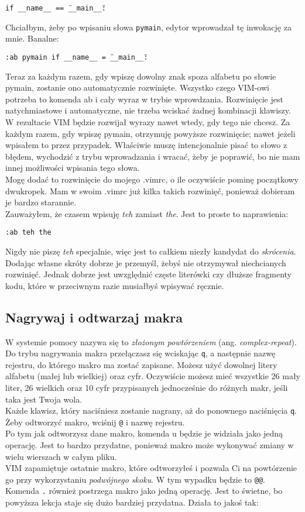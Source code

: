 \documentclass[a4paper,12pt]{article}
\begin{document}
{\tt if \_\_name\_\_ == \"{}\_\_main\_\_\"{}:}

\noindent
Chciałbym, żeby po wpisaniu słowa {\tt pymain}, edytor wprowadzał tę inwokację za mnie. Banalne:

{\tt :ab pymain if \_\_name\_\_ = \"{}\_\_main\_\_\"{}:}

\noindent
Teraz za każdym razem, gdy wpiszę dowolny znak spoza alfabetu po słowie pymain, zostanie ono automatycznie rozwinięte. Wszystko czego VIM-owi potrzeba to komenda ab i cały wyraz w trybie wprowdzania. Rozwinięcie jest natychmiastowe i automatyczne, nie trzeba wciskać żadnej kombinacji klawiszy. W rezultacie VIM będzie rozwijał wyrazy nawet wtedy, gdy tego nie chcesz. Za każdym razem, gdy wpiszę pymain, otrzymuję powyższe rozwinięcie; nawet jeżeli wpisałem to przez przypadek. Właściwie muszę intencjonalnie pisać to słowo z błędem, wychodzić z trybu wprowadzania i wracać, żeby je poprawić, bo nie mam innej możliwości wpisania tego słowa.\\
Mogę dodać to rozwinięcie do mojego .vimrc, o ile oczywiście pominę początkowy dwukropek. Mam w swoim .vimrc już kilka takich rozwinięć, ponieważ dobieram je bardzo starannie.\\
Zauważyłem, że czasem wpisuję {\it teh} zamiast {\it the}. Jest to proste to naprawienia:

{\tt :ab teh the}

\noindent
Nigdy nie piszę {\it teh} specjalnie, więc jest to całkiem niezły kandydat do {\it skrócenia}.\\
Dodając własne skróty dobrze je przemyśl, żebyś nie otrzymywał niechcianych rozwinięć. Jednak dobrze jest uwzględnić częste literówki czy dłuższe fragmenty kodu, które w przeciwnym razie musiałbyś wpisywać ręcznie.
\subsection{Nagrywaj i odtwarzaj makra}
W systemie pomocy nazywa się to {\it złożonym powtórzeniem} (ang. {\it complex-repeat}).\\
Do trybu nagrywania makra przełączasz się wciskając {\tt q}, a następnie nazwę rejestru, do którego makro ma zostać zapisane. Możesz użyć dowolnej litery alfabetu (małej lub wielkiej) oraz cyfr. Oczywiście możesz mieć wszystkie 26 mały liter, 26 wielkich oraz 10 cyfr przypisanych jednocześnie do różnych makr, jeśli taka jest Twoja wola.\\
Każde klawisz, który naciśniesz zostanie nagrany, aż do ponownego naciśnięcia {\tt q}.\\
Żeby odtworzyć makro, wciśnij {\tt @} i nazwę rejestru.\\
Po tym jak odtworzysz dane makro, komenda u będzie je widziała jako jedną operację. Jest to bardzo przydatne, ponieważ makro może wykonywać zmiany w wielu wierszach w całym pliku.\\
VIM zapamiętuje ostatnie makro, które odtworzyłeś i pozwala Ci na powtórzenie go przy wykorzystaniu {\it podwójnego skoku}. W tym wypadku będzie to {\tt @@}.\\
Komenda {\tt .} również postrzega makro jako jedną operację. Jest to świetne, bo powyższa lekcja staje się dużo bardziej przydatna. Działa to jakoś tak:
\end{document}
